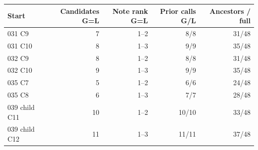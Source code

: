 \begin{tabular}{@{}lrrrr@{}}
\toprule
Start & Candidates G=L & Note rank G=L & Prior calls G/L & Ancestors / full \\
\midrule
031 C9 & 7 & 1--2 & 8/8 & 31/48 \\
031 C10 & 8 & 1--3 & 9/9 & 35/48 \\
032 C9 & 8 & 1--2 & 8/8 & 31/48 \\
032 C10 & 9 & 1--3 & 9/9 & 35/48 \\
035 C7 & 5 & 1--2 & 6/6 & 24/48 \\
035 C8 & 6 & 1--3 & 7/7 & 28/48 \\
039 child C11 & 10 & 1--2 & 10/10 & 33/48 \\
039 child C12 & 11 & 1--3 & 11/11 & 37/48 \\
\bottomrule
\end{tabular}
